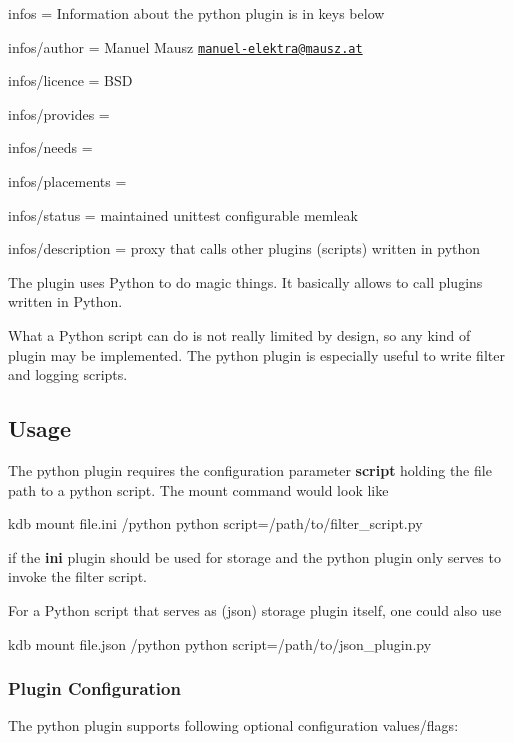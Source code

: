 
\begin{DoxyItemize}
\item infos = Information about the python plugin is in keys below
\item infos/author = Manuel Mausz \href{mailto:manuel-elektra@mausz.at}{\tt manuel-\/elektra@mausz.\+at}
\item infos/licence = B\+S\+D
\item infos/provides =
\item infos/needs =
\item infos/placements =
\item infos/status = maintained unittest configurable memleak
\item infos/description = proxy that calls other plugins (scripts) written in python
\end{DoxyItemize}

The plugin uses Python to do magic things. It basically allows to call plugins written in Python.

What a Python script can do is not really limited by design, so any kind of plugin may be implemented. The python plugin is especially useful to write filter and logging scripts.

\subsection*{Usage}

The python plugin requires the configuration parameter {\bfseries script} holding the file path to a python script. The mount command would look like \begin{DoxyVerb}kdb mount file.ini /python python script=/path/to/filter_script.py
\end{DoxyVerb}


if the {\bfseries ini} plugin should be used for storage and the python plugin only serves to invoke the filter script.

For a Python script that serves as (json) storage plugin itself, one could also use \begin{DoxyVerb}kdb mount file.json /python python script=/path/to/json_plugin.py
\end{DoxyVerb}


\subsubsection*{Plugin Configuration}

The python plugin supports following optional configuration values/flags\+:


